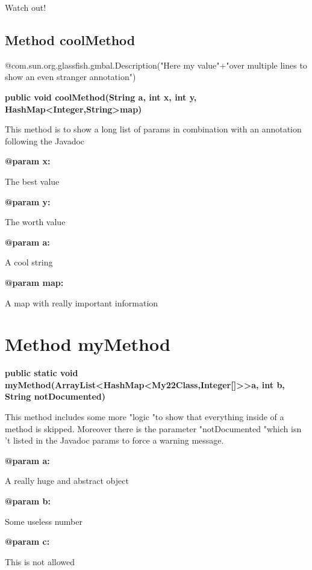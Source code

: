 \documentclass[12pt]{scrreprt}
\begin{document}
\quad\quad Watch out!


\subsection{Method coolMethod}
\label{examples.SimpleExample.My22Class:coolMethod}

@com.sun.org.glassfish.gmbal.Description("Here my value"+"over multiple lines to show an even stranger annotation")



\textbf{public void coolMethod(String a, int x, int y, HashMap\textless Integer,String\textgreater  map)}


This method is to show a long list of params in combination with an annotation following the Javadoc



\textbf{@param x:}

\quad\quad The best value

\textbf{@param y:}

\quad\quad The worth value

\textbf{@param a:}

\quad\quad A cool string

\textbf{@param map:}

\quad\quad A map with really important information



\section{Method myMethod}
\label{examples.SimpleExample:myMethod}




\textbf{public static void myMethod(ArrayList\textless HashMap\textless My22Class,Integer[]\textgreater \textgreater  a, int b, String notDocumented)}


This method includes some more "logic "to show that everything inside of a method is skipped. Moreover there is the parameter "notDocumented "which isn 't listed in the Javadoc params to force a warning message.



\textbf{@param a:}

\quad\quad A really huge and abstract object

\textbf{@param b:}

\quad\quad Some useless number

\textbf{@param c:}

\quad\quad This is not allowed
\end{document}
